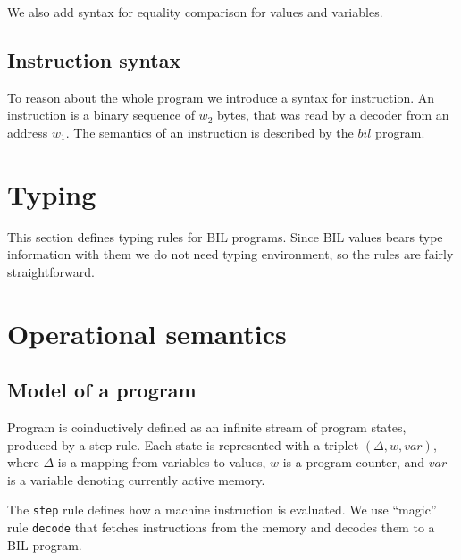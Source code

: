 \documentclass[11pt]{article}
\begin{document}
We also add syntax for equality comparison for values and variables.


\ottgrammartabular{
\ottdelta\ottinterrule
}

\ottgrammartabular{
\ottformula\ottinterrule
}

\ottgrammartabular{
\ottnat\ottinterrule
}

\subsection{Instruction syntax}
\label{sec:insn}

To reason about the whole program we introduce a syntax for
instruction. An instruction is a binary sequence of $\mathit{w_2}$
bytes, that was read by a decoder from an address $\mathit{w_1}$. The
semantics of an instruction is described by the $\mathit{bil}$ program.

\ottgrammartabular{
\ottinsn\ottinterrule
}

\clearpage

\section{Typing}
\label{sec:typing}

This section defines typing rules for BIL programs. Since BIL values
bears type information with them we do not need typing environment, so
the rules are fairly straightforward.

\ottdefnstypingXXstmt

\ottdefnstypingXXexp

\clearpage


\section{Operational semantics}

\subsection{Model of a program}

Program is coinductively defined as an infinite stream of program
states, produced by a step rule. Each state is represented with a
triplet $(\Delta, w, var)$, where $\Delta$ is a mapping from variables
to values, $w$ is a program counter, and $var$ is a variable
denoting currently active memory.

The \verb|step| rule defines how a machine instruction is
evaluated. We use ``magic'' rule \verb|decode| that fetches
instructions from the memory and decodes them to a BIL program.
\end{document}
